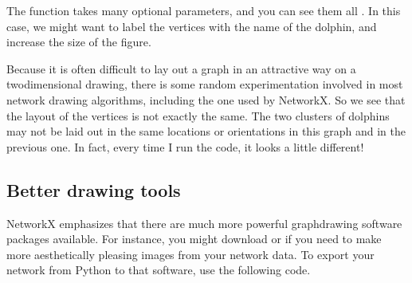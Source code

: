 \documentclass[letterpaper,10pt,english]{sphinxmanual}
\begin{document}
The  function takes many optional parameters, and you can see them all .  In this case, we might want to label the vertices with the name of the dolphin, and increase the size of the figure.

\begin{sphinxVerbatim}[commandchars=\\\{\}]
    
    
\end{sphinxVerbatim}

\noindent{}

Because it is often difficult to lay out a graph in an attractive way on a two\sphinxhyphen{}dimensional drawing, there is some random experimentation involved in most network drawing algorithms, including the one used by NetworkX.  So we see that the layout of the vertices is not exactly the same.  The two clusters of dolphins may not be laid out in the same locations or orientations in this graph and in the previous one.  In fact, every time I run the code, it looks a little different!


\subsection{Better drawing tools}
\label{\detokenize{chapter-15-networks:better-drawing-tools}}
NetworkX emphasizes that there are much more powerful graph\sphinxhyphen{}drawing software packages available.  For instance, you might download  or  if you need to make more aesthetically pleasing images from your network data.  To export your network from Python to that software, use the following code.

\begin{sphinxVerbatim}[commandchars=\\\{\}]
   
\end{sphinxVerbatim}
\end{document}
